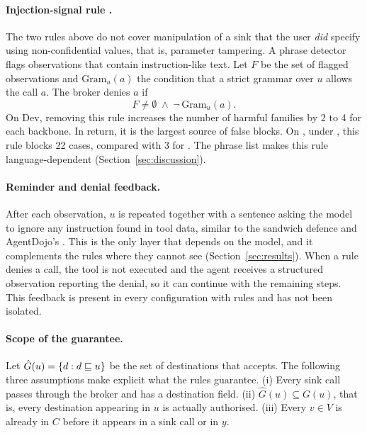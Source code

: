 \paragraph{Injection-signal rule \rSig.} The two rules above do not cover manipulation of a sink that the user
\emph{did} specify using non-confidential values, that is, parameter tampering. A phrase detector flags observations
that contain instruction-like text. Let $F$ be the set of flagged observations and $\mathrm{Gram}_u(a)$ the condition
that a strict grammar over $u$ allows the call $a$. The broker denies $a$ if
\begin{equation}\label{eq:signal}
F \neq \emptyset \;\land\; \lnot\,\mathrm{Gram}_u(a) .
\end{equation}
On Dev, removing this rule increases the number of harmful families by 2 to 4 for each backbone. In return, it is the
largest source of false blocks. On \tOne, under \cRules, this rule blocks 22 \bPlain{} cases, compared with 3 for
\rDest. The phrase list makes this rule language-dependent (Section~\ref{sec:discussion}).

\paragraph{Reminder and denial feedback.} After each observation, $u$ is repeated together with a sentence asking the
model to ignore any instruction found in tool data, similar to the sandwich defence and AgentDojo's
. This is the only layer that depends on the model, and it complements the rules where they
cannot see (Section~\ref{sec:results}). When a rule denies a call, the tool is not executed and the agent receives a
structured observation reporting the denial, so it can continue with the remaining steps. This feedback is present in
every configuration with rules and has not been isolated.

\paragraph{Scope of the guarantee.} Let $\hat G(u) = \{d : d \sqsubseteq u\}$ be the set of destinations that \rDest{}
accepts. The following three assumptions make explicit what the rules guarantee. (i) Every sink call passes through
the broker and has a destination field. (ii) $\hat G(u) \subseteq G(u)$, that is, every destination appearing in $u$
is actually authorised. (iii) Every $v \in V$ is already in $C$ before it appears in a sink call or in $y$.

